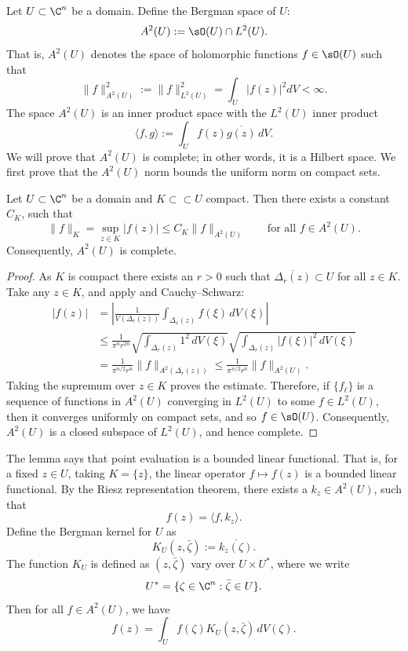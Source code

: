 
Let $U\subset\C^n$ be a domain. Define the Bergman space of $U$:
\[A^2(U):=\sO(U)\cap L^2(U).\]
That is, $A^2(U)$ denotes the space of holomorphic functions $f\in\sO(U)$ such that
\[\|f\|_{A^2(U)}^2:=\|f\|_{L^2(U)}^2=\int_U|f(z)|^2dV<\infty.\]
The space $A^2(U)$ is an inner product space with the $L^2(U)$ inner product
\[\langle f,g\rangle:=\int_U f(z)\overline{g(z)}\,dV.\]
We will prove that $A^2(U)$ is complete; in other words, it is a Hilbert space. We first prove that the $A^2(U)$ norm bounds the uniform norm on compact sets.
\begin{lemma}\label{lemma:bergmanKbound}
Let $U\subset\C^n$ be a domain and $K\subset\subset U$ compact. Then there exists a constant $C_K$, such that
\[\|f\|_K=\sup_{z\in K}|f(z)|\leq C_K\|f\|_{A^2(U)}\qquad\text{for all }f\in A^2(U).\]
Consequently, $A^2(U)$ is complete.
\end{lemma}
\begin{proof}
As $K$ is compact there exists an $r>0$ such that $\overline{\Delta_r(z)}\subset U$ for all $z\in K$. Take any $z\in K$, and apply  and Cauchy--Schwarz:
\begin{align*}
|f(z)|&=\left|\frac1{V(\Delta_r(z))}\int_{\Delta_r(z)}f(\xi)\,dV(\xi)\right|\\
&\leq\frac1{\pi^nr^{2n}}\sqrt{\int_{\Delta_r(z)}1^2\,dV(\xi)}\sqrt{\int_{\Delta_r(z)}|f(\xi)|^2\,dV(\xi)}\\
&=\frac1{\pi^{n/2}r^n}\|f\|_{A^2(\Delta_r(z))}\leq\frac1{\pi^{n/2}r^n}\|f\|_{A^2(U)}.
\end{align*}
Taking the supremum over $z\in K$ proves the estimate. Therefore, if $\{f_\ell\}$ is a sequence of functions in $A^2(U)$ converging in $L^2(U)$ to some $f\in L^2(U)$, then it converges uniformly on compact sets, and so $f\in\sO(U)$. Consequently, $A^2(U)$ is a closed subspace of $L^2(U)$, and hence complete.
\end{proof}
The lemma says that point evaluation is a bounded linear functional. That is, for a fixed $z\in U$, taking $K=\{z\}$, the linear operator $f\mapsto f(z)$ is a bounded linear functional. By the Riesz representation theorem, there exists a $k_z\in A^2(U)$, such that
\[f(z)=\langle f,k_z\rangle.\]
Define the Bergman kernel for $U$ as
\[K_U(z,\bar\zeta):=\overline{k_z(\zeta)}.\]
The function $K_U$ is defined as $(z,\bar\zeta)$ vary over $U\times U^*$, where we write
\[U^*=\{\zeta\in\C^n:\bar\zeta\in U\}.\]
Then for all $f\in A^2(U)$, we have
\begin{equation}\label{eq:repropropBergman}
f(z)=\int_U f(\zeta)K_U(z,\bar\zeta)\,dV(\zeta).
\end{equation}
